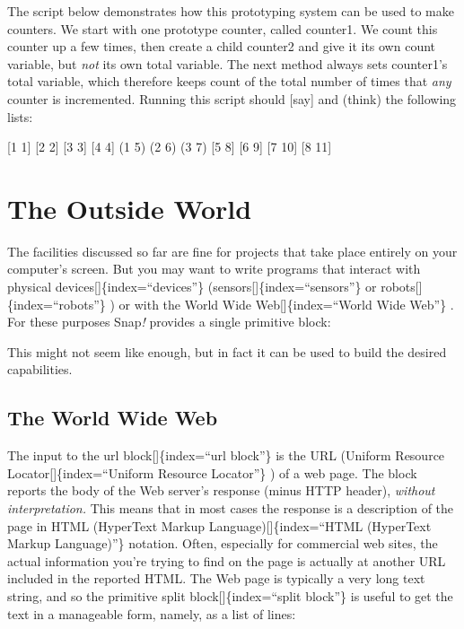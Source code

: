 \documentclass[
  letterpaper,
]{book}
\begin{document}
The script below demonstrates how this prototyping system can be used to
make counters. We start with one prototype counter, called counter1. We
count this counter up a few times, then create a child counter2 and give
it its own count variable, but \emph{not} its own total variable. The
next method always sets counter1's total variable, which therefore keeps
count of the total number of times that \emph{any} counter is
incremented. Running this script should {[}say{]} and (think) the
following lists:

{[}1 1{]} {[}2 2{]} {[}3 3{]} {[}4 4{]} (1 5) (2 6) (3 7) {[}5 8{]} {[}6
9{]} {[}7 10{]} {[}8 11{]}


\chapter{The Outside World}\label{the-outside-world}

The facilities discussed so far are fine for projects that take place
entirely on your computer's screen. But you may want to write programs
that interact with physical devices{[}{]}\{index=``devices''\}
(sensors{[}{]}\{index=``sensors''\} or robots{[}{]}\{index=``robots''\}
) or with the World Wide Web{[}{]}\{index=``World Wide Web''\} . For
these purposes Snap\emph{!} provides a
\label{url}{}single primitive block:

This might not seem like enough, but in fact it can be used to build the
desired capabilities.

\section{The World Wide Web}\label{the-world-wide-web}

The input to the url block{[}{]}\{index=``url block''\} is the URL
(Uniform Resource Locator{[}{]}\{index=``Uniform Resource Locator''\} )
of a web page. The block reports the body of the Web server's response
(minus HTTP header), \emph{without interpretation.} This means that in
most cases the response is a description of the page in HTML (HyperText
Markup Language){[}{]}\{index=``HTML (HyperText Markup Language)''\}
notation. Often, especially for commercial web sites, the actual
information you're trying to find on the page is actually at another URL
included in the reported HTML. The Web page is typically a very long
text string, and so the primitive split block{[}{]}\{index=``split
block''\} is useful to get the text in a manageable form, namely, as a
list of lines:
\end{document}
